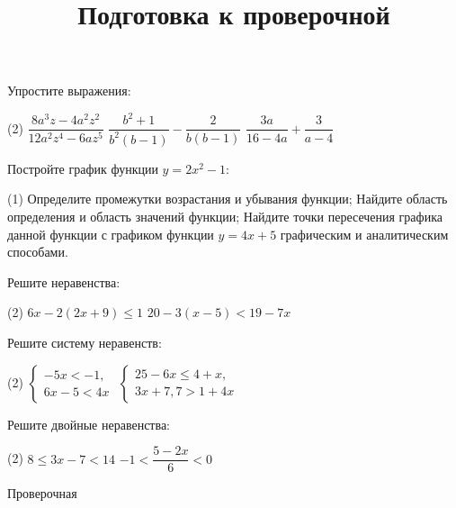 \begin{class}[number=7]
	\title{Подготовка к проверочной}
	\begin{listofex}
		\item Упростите выражения:
		\begin{tasks}(2)
			\task \( \dfrac{8a^3z-4a^2z^2}{12a^2z^4-6az^5} \)
			\task \( \dfrac{b^2+1}{b^2(b-1)}-\dfrac{2}{b(b-1)} \)
			\task \( \dfrac{3a}{16-4a}+\dfrac{3}{a-4} \)
		\end{tasks}
		\item Постройте график функции \( y=2x^2-1 \):
		\begin{tasks}(1)
			\task Определите промежутки возрастания и убывания функции;
			\task Найдите область определения и область значений функции;
			\task Найдите точки пересечения графика данной функции с графиком функции \( y=4x+5 \) графическим и аналитическим способами.
		\end{tasks}
		\item Решите неравенства:
		\begin{tasks}(2)
			\task \( 6x-2(2x+9)\leq1 \)
			\task \( 20-3(x-5)<19-7x \)
		\end{tasks}
		\item Решите систему неравенств:
		\begin{tasks}(2)
			\task \( \left\{
			\begin{array}{l}
				-5x<-1,\\
				6x-5<4x
			\end{array}
			\right. \)
			\task \( \left\{
			\begin{array}{l}
				25-6x\leq4+x,\\
				3x+7,7>1+4x
			\end{array}
			\right. \)
		\end{tasks}
		\item Решите двойные неравенства:
		\begin{tasks}(2)
			\task \( 8\leq3x-7<14 \)
			\task \( -1<\dfrac{5-2x}{6}<0 \)
		\end{tasks}
	\end{listofex}
\end{class}

\begin{exam}
	\begin{listofex}
		\item Проверочная
	\end{listofex}
\end{exam}

